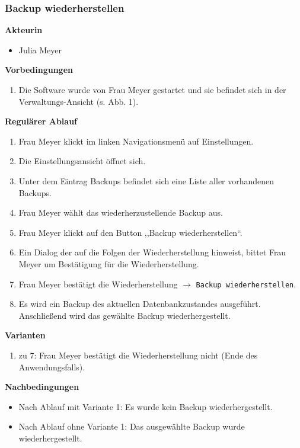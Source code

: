 \documentclass[fontsize=12pt,paper=a4,twoside]{scrartcl}
\begin{document}
\subsubsection{Backup wiederherstellen}
\textbf{Akteurin}
\begin{itemize}
\item Julia Meyer
\end{itemize}
\vspace{5pt}

\textbf{Vorbedingungen}
\begin{enumerate}
\item Die Software wurde von Frau Meyer gestartet und sie befindet sich in der Verwaltungs-Ansicht (s. Abb. 1).
\end{enumerate}
\vspace{5pt}

\textbf{Regulärer Ablauf}
\begin{enumerate}
\item Frau Meyer klickt im linken Navigationsmenü auf Einstellungen.
\item Die Einstellungsansicht öffnet sich. 
\item Unter dem Eintrag Backups befindet sich eine Liste aller vorhandenen Backups.
\item Frau Meyer wählt das wiederherzustellende Backup aus.
\item Frau Meyer klickt auf den Button ,,Backup wiederherstellen``.
\item Ein Dialog der auf die Folgen der Wiederherstellung hinweist, bittet Frau Meyer um Bestätigung für die Wiederherstellung.
\item Frau Meyer bestätigt die Wiederherstellung $\rightarrow$ \texttt{Backup wiederherstellen}.
\item Es wird ein Backup des aktuellen Datenbankzustandes ausgeführt. Anschließend wird das gewählte Backup wiederhergestellt.
\end{enumerate}
\vspace{5pt}

\textbf{Varianten}
\begin{enumerate}
\item zu 7: Frau Meyer bestätigt die Wiederherstellung nicht (Ende des Anwendungsfalls).
\end{enumerate}
\vspace{5pt}

\textbf{Nachbedingungen}
\begin{itemize}
\item Nach Ablauf mit Variante 1: Es wurde kein Backup wiederhergestellt.
\item Nach Ablauf ohne Variante 1: Das ausgewählte Backup wurde wiederhergestellt.
\end{itemize}
\vspace{5pt}
\end{document}
